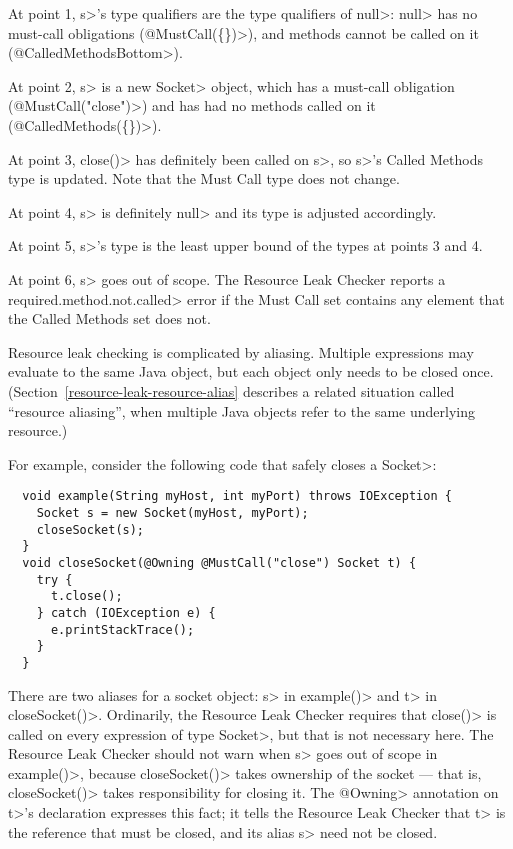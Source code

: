 At point 1, \<s>'s type qualifiers are the type qualifiers of \<null>:
\<null> has no must-call obligations (\<@MustCall(\{\})>),
and methods cannot be called on it (\<@CalledMethodsBottom>).

At point 2, \<s> is a new \<Socket> object, which
has a must-call obligation (\<@MustCall("close")>)
and has had no methods called on it (\<@CalledMethods(\{\})>).

At point 3, \<close()> has definitely been called on \<s>, so
\<s>'s Called Methods type is updated. Note that the Must Call type
does not change.

At point 4, \<s> is definitely \<null> and its type is adjusted accordingly.

At point 5, \<s>'s type is the least upper bound of the types at points 3
and 4.

At point 6, \<s> goes out of scope.  The Resource Leak Checker reports a
\<required.method.not.called> error if the Must Call set contains any
element that the Called Methods set does not.



Resource leak checking is complicated by aliasing.  Multiple expressions
may evaluate to the same Java object, but each object only needs to be
closed once.  (Section~\ref{resource-leak-resource-alias} describes a
related situation called ``resource aliasing'', when multiple Java objects
refer to the same underlying resource.)

For example, consider the following code that safely closes a \<Socket>:

\begin{verbatim}
  void example(String myHost, int myPort) throws IOException {
    Socket s = new Socket(myHost, myPort);
    closeSocket(s);
  }
  void closeSocket(@Owning @MustCall("close") Socket t) {
    try {
      t.close();
    } catch (IOException e) {
      e.printStackTrace();
    }
  }
\end{verbatim}

There are two aliases for a socket object: \<s> in \<example()> and \<t> in
\<closeSocket()>.  Ordinarily, the Resource Leak Checker requires that
\<close()> is called on every expression of type \<Socket>, but that is not
necessary here.  The Resource Leak Checker should not warn when
\<s> goes out of scope in \<example()>, because \<closeSocket()> takes ownership
of the socket --- that is, \<closeSocket()> takes responsibility for closing
it. The \<@Owning> annotation on \<t>'s declaration expresses this fact; it
tells the Resource Leak Checker that \<t> is the reference that must be
closed, and its alias \<s> need not be closed.

